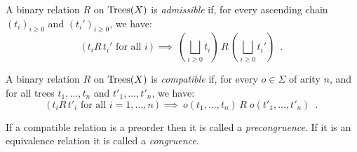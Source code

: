 %
%
%
%



\begin{definition}[Admissibility]
    A binary relation $R$ on $\textnormal{Trees}(X)$ is \emph{admissible} if,
    for every ascending chain $(t_i)_{i \geq 0}$ and 
    $(t_i')_{i\geq 0}$, we have:
    \[ \text{($\,t_i  R \, t_i'$ for all $i\,$)} ~ \implies~
        \left(\bigsqcup_{i \geq 0} t_i\right) \, R \, \left(\bigsqcup_{i \geq 0} t_i'\right) \enspace .
    \]
\end{definition}

\begin{definition}[Compatibility]
    A binary relation $R$ on $\textnormal{Trees}(X)$ is  \emph{compatible} if,
    for every $o \in \Sigma$ of arity $n$, and for all trees 
     $t_1,\dots, t_n$ and $t'_1, \dots, t'_n$, we have:
    \[ \text{($\,t_i  R \, t'_i$ for all $i = 1, \dots, n\,$)} ~ \implies ~ 
        o(t_1, \dots, t_n) \, R \; o(t'_1, \dots, t'_n) \enspace .
    \]
\end{definition}
If a compatible relation is a preorder then it is called a \emph{precongruence}. If it is an equivalence relation it is called a \emph{congruence}.


